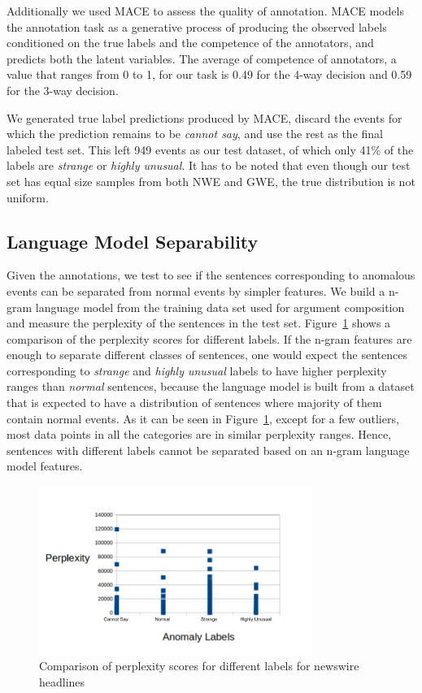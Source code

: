 Additionally we used
MACE \cite{hovy2013learning} to assess the quality of 
annotation.  MACE models the annotation task as a generative process of
producing the observed labels conditioned on the 
true labels and the competence of the annotators, and predicts both the latent
variables.  The average of competence of annotators, 
a value that ranges from 0 to 1, for our task is 0.49 for the 4-way decision and
0.59 for the 3-way decision.  

We generated
true label predictions produced by MACE, discard the events for which the
prediction remains to be \textit{cannot say}, and use the 
rest as the final labeled test set.  This left 949 events as our test dataset,
of which only 41\% of the labels are \textit{strange} or \textit{highly
unusual}.  It has to be noted that even though our test set 
has equal size samples from both NWE and GWE, the true distribution is not
uniform.

\subsection{Language Model Separability}
Given the annotations, we test to see if the
sentences corresponding to anomalous events can be separated from normal events by simpler 
features.  We build a n-gram language model from the training data set used for argument composition and 
measure the perplexity of the sentences in the test set.  Figure~\ref{fig:event_anomaly_ppl} shows
a comparison of the perplexity scores for different labels. If the n-gram features are enough 
to separate different classes of sentences, one would expect the sentences corresponding to 
\textit{strange} and \textit{highly unusual} labels to have higher perplexity ranges than \textit{normal}
sentences, because the language model is built from a dataset that is expected to have a distribution of
sentences where majority of them contain normal events.  As it can be seen in Figure~\ref{fig:event_anomaly_ppl}, 
except for a few outliers, most data points in all the categories are in similar perplexity ranges.
Hence, sentences with different labels cannot be separated based on an n-gram language model features.

\begin{figure}
  \begin{center}
  \includegraphics[width=3.5in]{figures/event_anomaly_lm_ppl.png}
  \caption{Comparison of perplexity scores for different labels for newswire headlines}
  \label{fig:event_anomaly_ppl}
  \end{center}
\end{figure}


